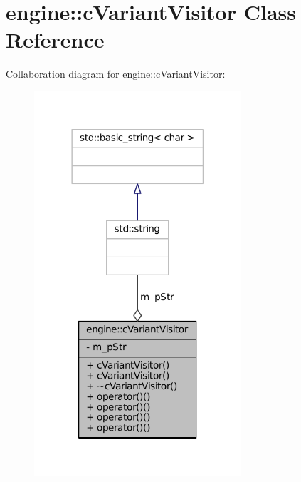 \hypertarget{classengine_1_1cVariantVisitor}{\section{engine\-:\-:c\-Variant\-Visitor \-Class \-Reference}
\label{classengine_1_1cVariantVisitor}
}


\-Collaboration diagram for engine\-:\-:c\-Variant\-Visitor\-:
\nopagebreak
\begin{figure}[H]
\begin{center}
\leavevmode
\includegraphics[width=218pt]{classengine_1_1cVariantVisitor__coll__graph}
\end{center}
\end{figure}
